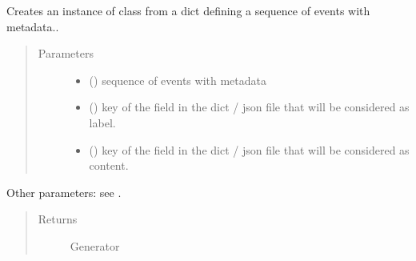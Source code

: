 \documentclass[letterpaper,10pt,english]{sphinxmanual}
\begin{document}
\begin{fulllineitems}
\label{\detokenize{index:GeneratorBuilder.new_generator_from_dict_memory}}
Creates an instance of class {\hyperref[\detokenize{index:Generator.Generator}]{}} from a dict defining a sequence of events with metadata..
\begin{quote}\begin{description}
\item[{Parameters}] \leavevmode\begin{itemize}
\item {} 
 () \textendash{} sequence of events with metadata

\item {} 
 () \textendash{} key of the field in the dict / json file that will be considered as label.

\item {} 
 () \textendash{} key of the field in the dict / json file that will be considered as content.

\end{itemize}

\end{description}\end{quote}

Other parameters: see {\hyperref[\detokenize{index:Generator.Generator}]{}}.
\begin{quote}\begin{description}
\item[{Returns}] \leavevmode
Generator


\end{description}
\end{quote}
\end{fulllineitems}
\end{document}
